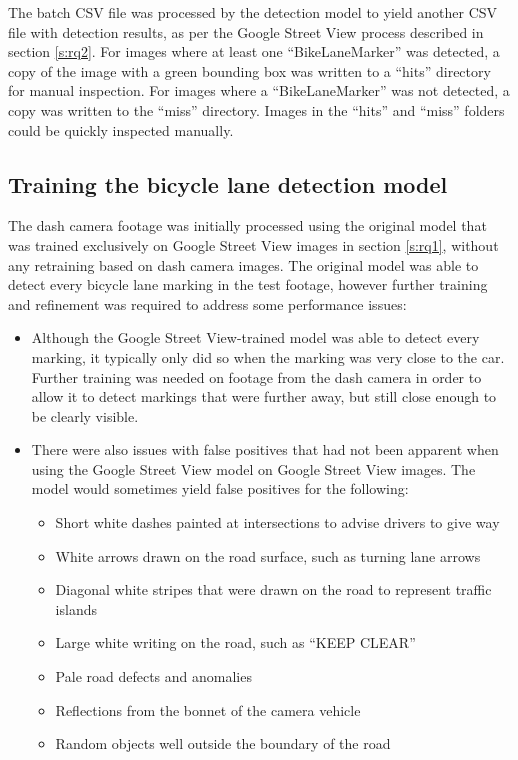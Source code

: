 \documentclass[11pt,twoside]{report}
\begin{document}
The batch CSV file was processed by the detection model to yield another CSV file with detection results, as per the Google Street View process described in section \ref{s:rq2}.  For images where at least one ``BikeLaneMarker'' was detected, a copy of the image with a green bounding box was written to a ``hits'' directory for manual inspection.  For images where a ``BikeLaneMarker'' was not detected, a copy was written to the ``miss'' directory.  Images in the ``hits'' and ``miss'' folders could be quickly inspected manually.


\subsection{Training the bicycle lane detection model}
\label{rq3c}

The dash camera footage was initially processed using the original model that was trained exclusively on Google Street View images in section \ref{s:rq1}, without any retraining based on dash camera images.  The original model was able to detect every bicycle lane marking in the test footage, however further training and refinement was required to address some performance issues:

\begin{itemize}
\item{Although the Google Street View-trained model was able to detect every marking, it typically only did so when the marking was very close to the car.  Further training was needed on footage from the dash camera in order to allow it to detect markings that were further away, but still close enough to be clearly visible.}
\item{There were also issues with false positives that had not been apparent when using the Google Street View model on Google Street View images.  The model would sometimes yield false positives for the following:

	\begin{itemize}
	\item{Short white dashes painted at intersections to advise drivers to give way}
	\item{White arrows drawn on the road surface, such as turning lane arrows}
	\item{Diagonal white stripes that were drawn on the road to represent traffic islands}
	\item{Large white writing on the road, such as ``KEEP CLEAR''}
	\item{Pale road defects and anomalies}
	\item{Reflections from the bonnet of the camera vehicle}
	\item{Random objects well outside the boundary of the road}
	\end{itemize}
}
\end{itemize}
\end{document}
